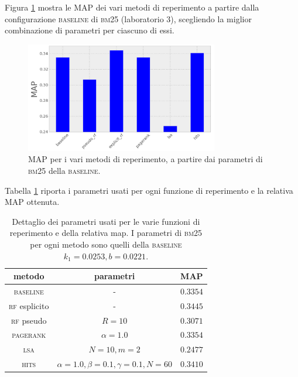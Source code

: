 Figura \ref{fig:map_hist} mostra le MAP dei vari metodi di reperimento a partire dalla configurazione \textsc{baseline} di \textsc{bm25} (laboratorio 3), scegliendo la miglior combinazione di parametri per ciascuno di essi. 
\begin{figure}[htpb]
	\begin{center}
		\includegraphics[width=0.75\textwidth]{figures/hist_map.png}
		\caption{MAP per i vari metodi di reperimento, a partire dai parametri di \textsc{bm25} della \textsc{baseline}.}
		\label{fig:map_hist}
	\end{center}
\end{figure}
Tabella \ref{tab:map} riporta i parametri usati per ogni funzione di reperimento e la relativa MAP ottenuta.
\begin{table}[htpb]
	\begin{center}
		\begin{tabular}{|c|c|c|}
			\hline
			metodo & parametri & MAP \\
			\hline
			\textsc{baseline} & - & $0.3354$ \\
			\textsc{rf} esplicito & - & $0.3445$ \\
			\textsc{rf} pseudo & $R=10$ & $0.3071$ \\
			\textsc{pagerank} & $\alpha=1.0$ & $0.3354$ \\
			\textsc{lsa} & $N=10, m=2$ & $0.2477$ \\
			\textsc{hits} & $\alpha=1.0, \beta=0.1, \gamma=0.1, N=60$ & $0.3410$ \\
			\hline
		\end{tabular}
	\end{center}
	\caption{Dettaglio dei parametri usati per le varie funzioni di reperimento e della relativa map. I parametri di \textsc{bm25} per ogni metodo sono quelli della \textsc{baseline} $k_1 = 0.0253, b = 0.0221$.}
	\label{tab:map}
\end{table}
\vspace{-0.3in}

